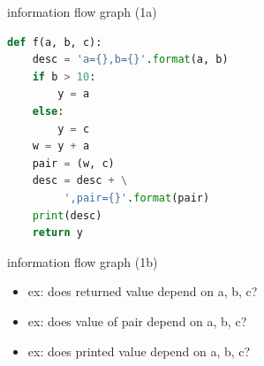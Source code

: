 \begin{frame}[fragile,label=infoFlowExample1a]{information flow graph (1a)}
\begin{lstlisting}[language=Python,style=smaller]
def f(a, b, c):
    desc = 'a={},b={}'.format(a, b)
    if b > 10:
        y = a
    else:
        y = c
    w = y + a
    pair = (w, c)
    desc = desc + \
         ',pair={}'.format(pair)
    print(desc)
    return y
\end{lstlisting}
\end{frame}

\begin{frame}[fragile,label=infoFlowExample1b]{information flow graph (1b)}
\begin{itemize}
\item<2-> ex: does returned value depend on a, b, c?
\item<2-> ex: does value of pair depend on a, b, c?
\item<2-> ex: does printed value depend on a, b, c?
\end{itemize}
\end{frame}
